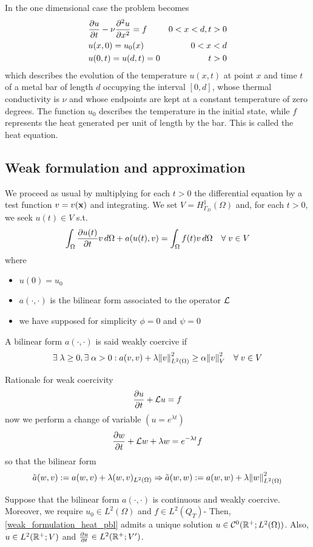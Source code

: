 In the one dimensional case the problem becomes 
\begin{equation}
    \begin{aligned}
        &\partialderivative{u}{t} - \nu \partialderivative{^2u}{x^2} = f & 0 < x <d, t> 0 \\
        &u(x,0) = u_0(x) & 0 < x < d \\
        & u(0,t) = u(d,t) = 0 & t>0
    \end{aligned}
    \label{one_dim_pbl}
\end{equation}
which describes the evolution of the temperature \(u(x,t)\) at point \(x\) and time \(t\) of a metal bar of length \(d\) occupying the interval \([0,d]\), whose thermal conductivity is \(\nu\) and whose endpoints are kept at a constant temperature of zero degrees. The function \(u_0\) describes the temperature in the initial state, while \(f\) represents the heat generated per unit of length by the bar. This is called the heat equation.
\subsection{Weak formulation and approximation}
We proceed as usual by multiplying for each \(t>0\) the differential equation by a test function \(v = v(\textbf{x})\) and integrating. We set \(V = H^1_{\Gamma_D}(\Omega)\) and, for each \(t>0\), we seek \(u(t)\in V\) s.t. 
\begin{equation}
    \int_{\Omega} \partialderivative{u(t)}{t} v \, d\Omega + a(u(t), v) = \int_\Omega f(t)v \, d\Omega \quad \forall \; v \in V 
    \label{weak_formulation_heat_pbl}
\end{equation}
where 
\begin{itemize}
    \item \(u(0) = u_0\)
    \item \(a(\cdot,\cdot)\) is the bilinear form associated to the operator \(\mathcal{L}\)
    \item we have supposed for simplicity \(\phi=0\) and \(\psi=0\)
\end{itemize}
\begin{definition}
    A bilinear form \(a(\cdot, \cdot)\) is said weakly coercive if 
    \[
        \exists \; \lambda \geq 0, \exists \; \alpha > 0 : a(v,v) + \lambda \norm{v}^2_{L^2(\Omega)} \geq \alpha \norm{v}^2_V \quad \forall \; v \in V
    \]
\end{definition}
Rationale for weak coercivity 
\[
    \partialderivative{u}{t} +\loperator u = f 
\]
now we perform a change of variable \((u = e^{\lambda t})\)
\[
    \partialderivative{w}{t} + \loperator w + \lambda w = e^{-\lambda t} f
\]
so that the bilinear form 
\[
    \tilde{a}(w,v) := a(w,v)+\lambda(w,v)_{L^2(\Omega)} \Rightarrow \tilde{a}(w,w) := a(w,w) + \lambda \norm{w}_{L^2(\Omega)}^2
\]
\begin{theorem}
    Suppose that the bilinear form \(a(\cdot,\cdot)\) is continuous and weakly coercive. Moreover, we require \(u_0 \in L^2(\Omega)\) and \(f \in L^2(Q_T)\)- Then, \eqref{weak_formulation_heat_pbl} admits a unique solution \(u \in \mathcal{C}^0 (\mathbb{R}^+;L^2(\Omega))\). Also, \(u \in L^2(\mathbb{R}^+;V)\) and \(\partialderivative{u}{t} \in L^2(\real^+; V')\).
\end{theorem}
